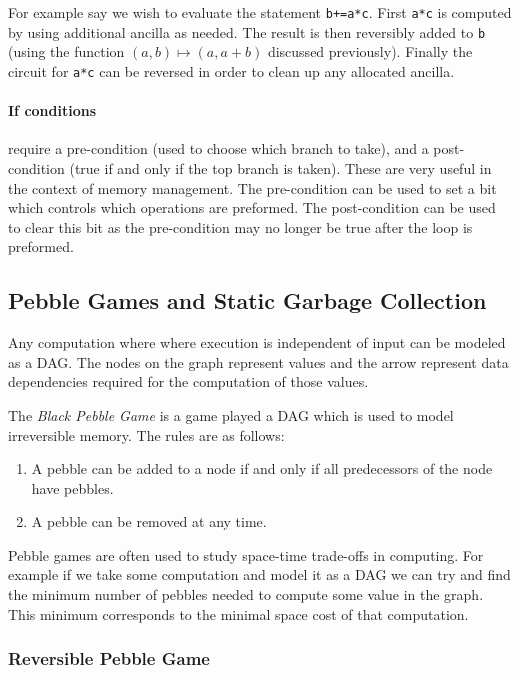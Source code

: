 For example say we wish to evaluate the statement \verb|b+=a*c|. First
\verb|a*c| is computed by using additional ancilla as needed. The result is
then reversibly added to \verb|b| (using the function $(a,b)\mapsto(a,a+b)$
discussed previously). Finally the circuit for \verb|a*c| can be reversed in
order to clean up any allocated ancilla.

\paragraph{If conditions} require a pre-condition (used to choose which branch
to take), and a post-condition (true if and only if the top branch is taken).
These are very useful in the context of memory management. The pre-condition can
be used to set a bit which controls which operations are preformed. The
post-condition can be used to clear this bit as the pre-condition may no longer
be true after the loop is preformed.


\subsection{Pebble Games and Static Garbage Collection}

Any computation where where execution is independent of input can be modeled as
a DAG. The nodes on the graph represent values and the arrow represent data
dependencies required for the computation of those values.

The \emph{Black Pebble Game} is a game played a DAG which is used to model
irreversible memory. The rules are as follows:
\begin{enumerate}
  \item A pebble can be added to a node if and only if all predecessors of the
    node have pebbles.
  \item A pebble can be removed at any time.
\end{enumerate}

Pebble games are often used to study space-time trade-offs in computing. For
example if we take some computation and model it as a DAG we can try and find
the minimum number of pebbles needed to compute some value in the graph. This
minimum corresponds to the minimal space cost of that computation.

\subsubsection{Reversible Pebble Game}

